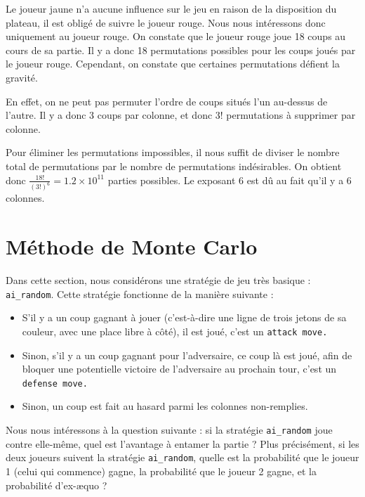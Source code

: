 \documentclass[11pt,answers]{exam}
\begin{document}
\begin{solutionbox}{210mm}
Le joueur jaune n'a aucune influence sur le jeu en raison de la disposition du plateau, il est obligé de suivre le joueur rouge. Nous nous intéressons donc uniquement au joueur rouge. On constate que le joueur rouge joue 18 coups au cours de sa partie. Il y a donc 18 permutations possibles pour les coups joués par le joueur rouge. Cependant, on constate que certaines permutations défient la gravité.

En effet, on ne peut pas permuter l'ordre de coups situés l'un au-dessus de l'autre. Il y a donc 3 coups par colonne, et donc 3! permutations à supprimer par colonne.

Pour éliminer les permutations impossibles, il nous suffit de diviser le nombre total de permutations par le nombre de permutations indésirables.
On obtient donc $\frac{18!}{(3!)^6} = 1.2 \times 10^{11}$
 parties possibles. Le exposant 6 est dû au fait qu'il y a 6 colonnes.

\end{solutionbox}

\newpage

\section{Méthode de Monte Carlo}

Dans cette section, nous considérons une stratégie de jeu très basique : \texttt{ai\_random}. Cette stratégie fonctionne de la manière suivante :
\begin{itemize}
    \item S'il y a un coup gagnant à jouer (c'est-à-dire une ligne de trois jetons de sa couleur, avec une place libre à côté), il est joué, c'est un \texttt{attack move.}
    \item Sinon, s'il y a un coup gagnant pour l'adversaire, ce coup là est joué, afin de bloquer une potentielle victoire de l'adversaire au prochain tour, c'est un \texttt{defense move.}
    \item Sinon, un coup est fait au hasard parmi les colonnes non-remplies.
\end{itemize}

Nous nous intéressons à la question suivante : si la stratégie \texttt{ai\_random} joue contre elle-même, quel est l'avantage à entamer la partie ? Plus précisément, si les deux joueurs suivent la stratégie \texttt{ai\_random}, quelle est la probabilité que le joueur 1 (celui qui commence) gagne, la probabilité que le joueur 2 gagne, et la probabilité d'ex-æquo ?
\end{document}
